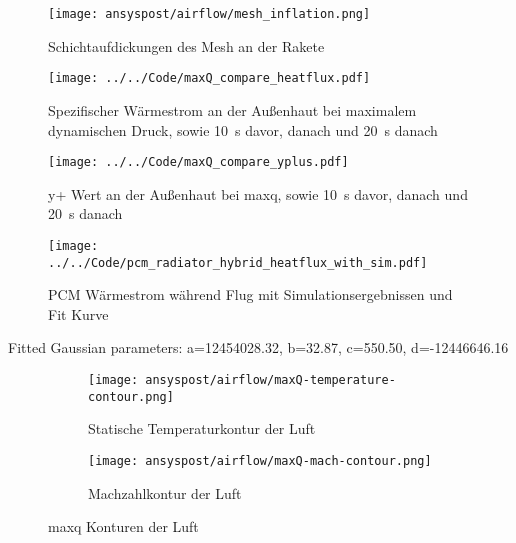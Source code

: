 \begin{figure}
  \centering
  \texttt{[image: ansyspost/airflow/mesh\_inflation.png]}
  \caption{Schichtaufdickungen des Mesh an der Rakete}\label{fig:aussenstroemung_mesh_inflationlayers}
\end{figure}

\begin{figure}
  \centering
  \texttt{[image: ../../Code/maxQ\_compare\_heatflux.pdf]}
  \caption{Spezifischer Wärmestrom an der Außenhaut bei maximalem dynamischen Druck, sowie \SI{10}{s} davor, danach und \SI{20}{s} danach}\label{fig:spezifischer_waermestrom_maxQ_simulationen}
\end{figure}

\begin{figure}
  \centering
  \texttt{[image: ../../Code/maxQ\_compare\_yplus.pdf]}
  \caption{y+ Wert an der Außenhaut bei \ac{maxq}, sowie \SI{10}{s} davor, danach und \SI{20}{s} danach}\label{fig:yplus_maxQ_simulationen}
\end{figure}

\begin{figure}
  \centering
  \texttt{[image: ../../Code/pcm\_radiator\_hybrid\_heatflux\_with\_sim.pdf]}
  \caption{PCM Wärmestrom während Flug mit Simulationsergebnissen und Fit Kurve}\label{fig:pcm_waermestrom_sim}
\end{figure}

Fitted Gaussian parameters:
a=12454028.32, b=32.87, c=550.50, d=-12446646.16

\begin{figure}
    \centering

    \begin{subfigure}{\textwidth}
        \centering
        \texttt{[image: ansyspost/airflow/maxQ-temperature-contour.png]}
        \caption{Statische Temperaturkontur der Luft}
        \label{fig:maxQ_temp_contour}
    \end{subfigure}

    \begin{subfigure}{\textwidth}
        \centering
        \texttt{[image: ansyspost/airflow/maxQ-mach-contour.png]}
        \caption{Machzahlkontur der Luft}
        \label{fig:maxQ_mach_contour}
    \end{subfigure}

    \caption{\texorpdfstring{\ac{maxq}}{max Q} Konturen der Luft}
    \label{fig:maxQ_konturen}
\end{figure}